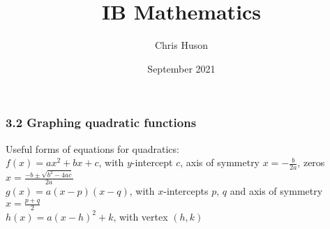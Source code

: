 \documentclass[12pt, twoside]{article}
\title{IB Mathematics}
\author{Chris Huson}
\date{September 2021}
\begin{document}
\subsubsection*{3.2 Graphing quadratic functions}
Useful forms of equations for quadratics:\\[0.25cm] 
$f(x)=ax^2 + bx+c$, with $y$-intercept $c$, axis of symmetry $\displaystyle x=-\frac{b}{2a}$, zeros $\displaystyle x=\frac{-b \pm \sqrt{b^2-4ac}}{2a}$\\[0.25cm]
$g(x)=a(x-p)(x-q)$, with $x$-intercepts $p$, $q$ and axis of symmetry $\displaystyle x=\frac{p+q}{2}$\\[0.25cm] 
$h(x)=a(x-h)^2+k$, with vertex $(h,k)$
\vspace{1cm}
\end{document}
